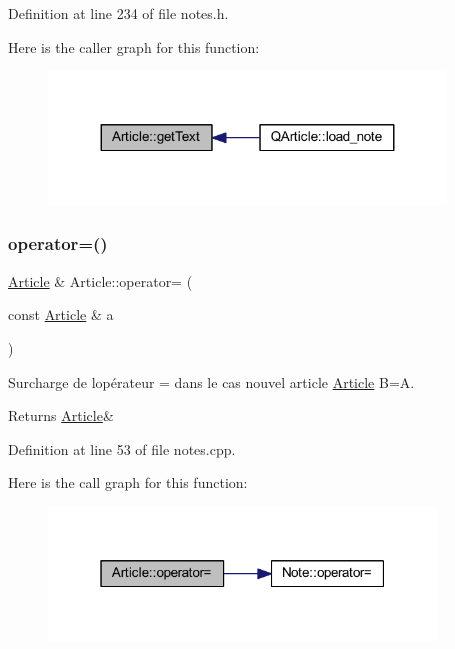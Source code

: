 Definition at line 234 of file notes.\+h.

Here is the caller graph for this function\+:\nopagebreak
\begin{figure}[H]
\begin{center}
\leavevmode
\includegraphics[width=299pt]{class_article_a178a250fddb6c30288d893f4f3439ca8_icgraph}
\end{center}
\end{figure}
\mbox{\label{class_article_ae4059abc035598ff3faf554fd74a1492}} 
\subsubsection{\texorpdfstring{operator=()}{operator=()}}
{\footnotesize\ttfamily \hyperlink{class_article}{Article} \& Article\+::operator= (\begin{DoxyParamCaption}\item[{const \hyperlink{class_article}{Article} \&}]{a }\end{DoxyParamCaption})}



Surcharge de l\textquotesingle{}opérateur = dans le cas nouvel article \hyperlink{class_article}{Article} B=A. 

\begin{DoxyReturn}{Returns}
\hyperlink{class_article}{Article}\& 
\end{DoxyReturn}


Definition at line 53 of file notes.\+cpp.

Here is the call graph for this function\+:\nopagebreak
\begin{figure}[H]
\begin{center}
\leavevmode
\includegraphics[width=292pt]{class_article_ae4059abc035598ff3faf554fd74a1492_cgraph}
\end{center}
\end{figure}
\mbox{\label{class_article_a83c6688e4886b871938b9dca34e78041}} 

